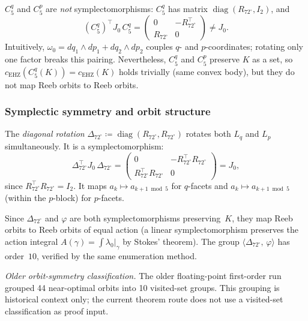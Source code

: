 \begin{unverified}
\begin{remark}\label{rem:non-symplectic-rotations}
$C_5^q$ and $C_5^p$ are \emph{not} symplectomorphisms:
$C_5^q$ has matrix $\operatorname{diag}(R_{72^\circ}, I_2)$, and
\[
  (C_5^q)^\top J_0\, C_5^q
  = \begin{pmatrix} 0 & -R_{72^\circ}^\top \\ R_{72^\circ} & 0 \end{pmatrix}
  \neq J_0.
\]
Intuitively, $\omega_0 = dq_1 \wedge dp_1 + dq_2 \wedge dp_2$ couples
$q$- and $p$-coordinates; rotating only one factor breaks this pairing.
Nevertheless, $C_5^q$ and $C_5^p$ preserve $K$ as a set, so
$c_{\mathrm{EHZ}}(C_5^q(K)) = c_{\mathrm{EHZ}}(K)$
holds trivially (same convex body), but they do not map Reeb orbits
to Reeb orbits.
\end{remark}
\end{unverified}

\subsubsection*{Symplectic symmetry and orbit structure}

The \emph{diagonal rotation}
$\Delta_{72^\circ} \coloneqq \operatorname{diag}(R_{72^\circ}, R_{72^\circ})$
rotates both $L_q$ and $L_p$ simultaneously.
It is a symplectomorphism:
\[
  \Delta_{72^\circ}^\top J_0\, \Delta_{72^\circ}
  = \begin{pmatrix} 0 & -R_{72^\circ}^\top R_{72^\circ} \\
    R_{72^\circ}^\top R_{72^\circ} & 0 \end{pmatrix}
  = J_0,
\]
since $R_{72^\circ}^\top R_{72^\circ} = I_2$.
It maps $a_k \mapsto a_{k+1\bmod 5}$ for $q$-facets and
$a_k \mapsto a_{k+1\bmod 5}$ (within the $p$-block) for $p$-facets.

Since $\Delta_{72^\circ}$ and $\varphi$ are both symplectomorphisms
preserving~$K$,
they map Reeb orbits to Reeb orbits of equal action
(a linear symplectomorphism preserves the action integral
$A(\gamma) = \int \lambda_0|_\gamma$ by Stokes' theorem).
The group $\langle \Delta_{72^\circ},\, \varphi \rangle$ has order~$10$,
verified by the same enumeration method.

\emph{Older orbit-symmetry classification.}
The older floating-point first-order run grouped 44 near-optimal
orbits into 10 visited-set groups.  This grouping is historical context only;
the current theorem route does not use a visited-set classification as proof
input.

